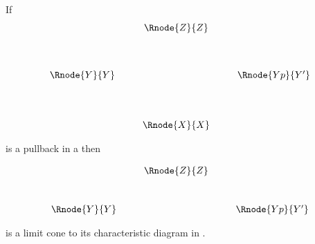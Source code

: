 \documentclass[10pt,a4paper]{scrartcl}
\begin{document}
\begin{lemma}
If 
\begin{displaymath}
\begin{array}{cp{0.3cm}c    p{0.3cm}  c }
               & & \Rnode{Z}{Z} & &                                  \\ [1.3cm]
\Rnode{Y}{Y}   &&                               & & \Rnode{Yp}{Y'}   \\ [1.4cm]
               & & \Rnode{X}{X} & &   
\end{array}
\end{displaymath}

\noindent
is a pullback in a \ccatc 
then 
\begin{center}
\begin{equation}
\label{pbselflimitcone}
\begin{array}{cp{0.3cm}c    p{0.3cm}  c }
               & & \Rnode{Z}{Z} & &                                  \\ [1.0cm]
\Rnode{Y}{Y}   &&                               & & \Rnode{Yp}{Y'}  
\end{array}
\end{equation}
\end{center}
is a limit cone to its characteristic diagram in \ccat.
\end{lemma}
\end{document}
